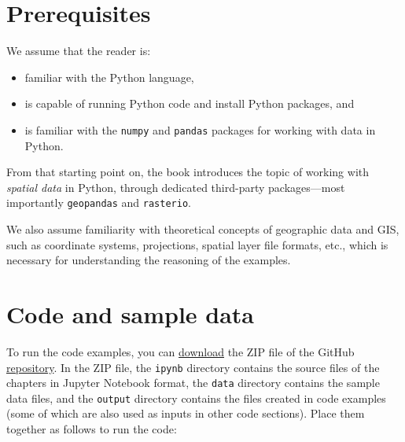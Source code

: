 \documentclass[
  letterpaper,
]{krantz}
\providecommand{\tightlist}{%
  \setlength{\itemsep}{0pt}\setlength{\parskip}{0pt}}\usepackage{longtable,booktabs,array}
\begin{document}
\section*{Prerequisites}\label{prerequisites}


We assume that the reader is:

\begin{itemize}
\tightlist
\item
  familiar with the Python language,
\item
  is capable of running Python code and install Python packages, and
\item
  is familiar with the \texttt{numpy} and \texttt{pandas} packages for
  working with data in Python.
\end{itemize}

From that starting point on, the book introduces the topic of working
with \emph{spatial data} in Python, through dedicated third-party
packages---most importantly \texttt{geopandas} and \texttt{rasterio}.

We also assume familiarity with theoretical concepts of geographic data
and GIS, such as coordinate systems, projections, spatial layer file
formats, etc., which is necessary for understanding the reasoning of the
examples.

\section*{Code and sample data}\label{code-and-sample-data}


To run the code examples, you can
\href{https://github.com/geocompx/geocompy/zipball/master}{download} the
ZIP file of the GitHub
\href{https://github.com/geocompx/geocompy/}{repository}. In the ZIP
file, the \texttt{ipynb} directory contains the source files of the
chapters in Jupyter Notebook format, the \texttt{data} directory
contains the sample data files, and the \texttt{output} directory
contains the files created in code examples (some of which are also used
as inputs in other code sections). Place them together as follows to run
the code:
\end{document}
